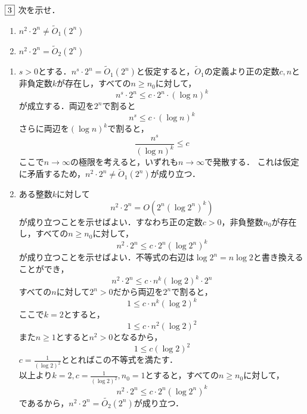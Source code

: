 \documentclass[dvipdfmx]{jsreport}
\begin{document}
\begin{tcolorbox}
	$\fbox{3}$ 次を示せ．
\begin{enumerate}
	\item $n^2\cdot 2^n\ne \tilde{O}_1(2^n)$
	\item $n^2\cdot 2^n= \tilde{O}_2(2^n)$
\end{enumerate}
\end{tcolorbox}

\begin{souanswer} %
\begin{enumerate}
	\item $s> 0$とする．$n^s\cdot 2^n= \tilde{O}_1(2^n)$と仮定すると，$\tilde{O}_1$の定義より正の定数$c, n$と非負定数$k$が存在し，すべての$n\ge n_0$に対して，
\begin{equation*}
	n^s\cdot 2^n\le c\cdot 2^n\cdot (\log{n})^k
\end{equation*}
	が成立する．両辺を$2^n$で割ると
\begin{equation*}
	n^s \le c\cdot (\log{n})^k
\end{equation*}
	さらに両辺を$(\log{n})^k$で割ると，
\begin{equation*}
	\frac{n^s}{(\log{n})^k}\le c
\end{equation*}
	ここで$n\to \infty$の極限を考えると，いずれも$n\to \infty$で発散する．
	これは仮定に矛盾するため，$n^2\cdot 2^n\ne \tilde{O}_1(2^n)$が成り立つ．

	\item ある整数$k$に対して
\begin{equation}
	n^2\cdot 2^n= O(2^n(\log{2^n})^k)
\end{equation}
	が成り立つことを示せばよい．すなわち正の定数$c> 0$，非負整数$n_0$が存在し，すべての$n\ge n_0$に対して，
\begin{equation}
	n^2\cdot 2^n\le c\cdot 2^n(\log{2^n})^k
\end{equation}
	が成り立つことを示せばよい．不等式の右辺は$\log{2^n}= n\log{2}$と書き換えることができ，
\begin{equation}
	n^2\cdot 2^n\le c\cdot n^k(\log{2})^k\cdot 2^n
\end{equation}
	すべての$n$に対して$2^n> 0$だから両辺を$2^n$で割ると，
\begin{equation}
	1\le c\cdot n^k(\log{2})^k
\end{equation}
	ここで$k= 2$とすると，
\begin{equation}
	1\le c\cdot n^2(\log{2})^2
\end{equation}
	また$n\ge 1$とすると$n^2> 0$となるから，
\begin{equation}
	1\le c(\log{2})^2
\end{equation}
	$c= \frac{1}{(\log{2})^2}$ととればこの不等式を満たす．\\
	以上より$k= 2, c= \frac{1}{(\log{2})^2}, n_0= 1$とすると，すべての$n\ge n_0$に対して，
\begin{equation}
	n^2\cdot 2^n\le c\cdot 2^n(\log{2^n})^k
\end{equation}
	であるから，$n^2\cdot 2^n= \tilde{O_2}(2^n)$が成り立つ．
\end{enumerate}
\end{souanswer}
\end{document}
